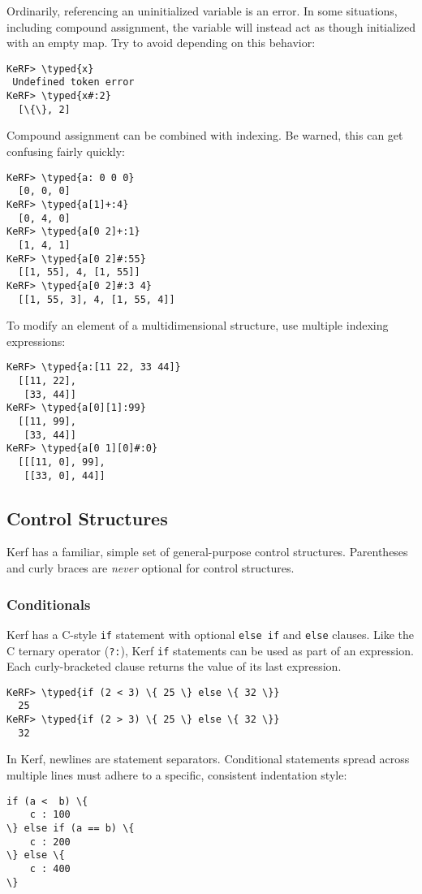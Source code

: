 \documentclass{article}
\newcommand{\typed}[1]{\textcolor{TealBlue}{#1}}
\begin{document}
Ordinarily, referencing an uninitialized variable is an error. In some situations, including compound assignment, the variable will instead act as though initialized with an empty map. Try to avoid depending on this behavior:
\begin{Verbatim}
KeRF> \typed{x}
 Undefined token error
KeRF> \typed{x#:2}
  [\{\}, 2]
\end{Verbatim}

Compound assignment can be combined with indexing. Be warned, this can get confusing fairly quickly:
\begin{Verbatim}
KeRF> \typed{a: 0 0 0}
  [0, 0, 0]
KeRF> \typed{a[1]+:4}
  [0, 4, 0]
KeRF> \typed{a[0 2]+:1}
  [1, 4, 1]
KeRF> \typed{a[0 2]#:55}
  [[1, 55], 4, [1, 55]]
KeRF> \typed{a[0 2]#:3 4}
  [[1, 55, 3], 4, [1, 55, 4]]
\end{Verbatim}

To modify an element of a multidimensional structure, use multiple indexing expressions:
\begin{Verbatim}
KeRF> \typed{a:[11 22, 33 44]}
  [[11, 22], 
   [33, 44]]
KeRF> \typed{a[0][1]:99}
  [[11, 99], 
   [33, 44]]
KeRF> \typed{a[0 1][0]#:0}
  [[[11, 0], 99], 
   [[33, 0], 44]]
\end{Verbatim}

\pagebreak
\subsection{Control Structures}
Kerf has a familiar, simple set of general-purpose control structures. Parentheses and curly braces are \emph{never} optional for control structures.

\subsubsection{Conditionals}
Kerf has a C-style \texttt{if} statement with optional \texttt{else if} and \texttt{else} clauses. Like the C ternary operator (\texttt{?:}), Kerf \texttt{if} statements can be used as part of an expression. Each curly-bracketed clause returns the value of its last expression.
\begin{Verbatim}
KeRF> \typed{if (2 < 3) \{ 25 \} else \{ 32 \}}
  25
KeRF> \typed{if (2 > 3) \{ 25 \} else \{ 32 \}}
  32
\end{Verbatim}

In Kerf, newlines are statement separators. Conditional statements spread across multiple lines must adhere to a specific, consistent indentation style:
\begin{Verbatim}
if (a <  b) \{
	c : 100
\} else if (a == b) \{
	c : 200
\} else \{
	c : 400
\}
\end{Verbatim}
\end{document}
